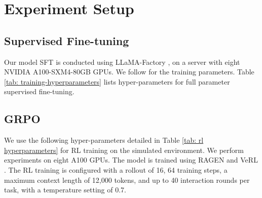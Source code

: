\section{Experiment Setup}
\label{Detailed Experiment Setup}


\subsection{Supervised Fine-tuning}
\label{SFT Setup}


Our model SFT is conducted using LLaMA-Factory \citep{zheng2024llamafactory}, on a server with eight NVIDIA A100-SXM4-80GB GPUs. We follow \cite{prabhakar2025apigen} for the training parameters.
Table \ref{tab: training-hyperparameters} lists hyper-parameters for full parameter supervised fine-tuning. 


\begin{table}[!h]
\small
\centering
\caption{Hyper-parameters used for full parameter supervised fine-tuning.}
\label{tab: training-hyperparameters}
\end{table}


\subsection{GRPO}
\label{Grpo Setup}

We use the following hyper-parameters detailed in Table \ref{tab: rl hyperparameters} for RL training on the simulated environment. We perform experiments on eight A100 GPUs. The model is trained using RAGEN \citep{ragen}and VeRL \citep{sheng2024hybridflow}. The RL training is configured with a rollout of 16, 64 training steps, a maximum context length of 12,000 tokens, and up to 40 interaction rounds per task, with a temperature setting of 0.7. 

